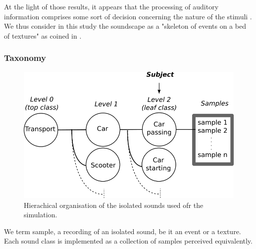 \documentclass[twoside,twocolumn]{article}
\begin{document}
At the light of those results, it appears that the processing of auditory information comprises some sort of decision concerning the nature of the stimuli \cite{nelken2013ear,mcdermott2013summary}. We thus consider in this study the soundscape as a "skeleton of events on a bed of textures" as coined in \cite{nelken2013ear}.

\subsubsection*{Taxonomy}

\begin{figure}[t]
        \myfloatalign
        \includegraphics[width=.8\linewidth]{gfx/ch_4/3.png}
       \caption{Hierachical organisation of the isolated sounds used ofr the simulation.}\label{fig:orgDb}
\end{figure}


We term sample, a recording of an isolated sound, be it an event or a texture. Each sound class is implemented as a collection of samples perceived equivalently.

\end{document}
